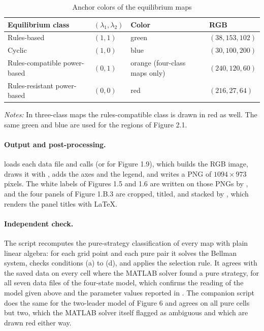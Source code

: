 \begin{table}[htbp]
\caption{Anchor colors of the equilibrium maps}
\label{tab:colors}
\centering
\small
\begin{tabular}{@{}llll@{}}
\toprule
Equilibrium class & $(\lambda_1, \lambda_2)$ & Color & RGB \\
\midrule
Rules-based & $(1, 1)$ & green & $(38, 153, 102)$ \\
Cyclic & $(1, 0)$ & blue & $(30, 100, 200)$ \\
Rules-compatible power-based & $(0, 1)$ & orange (four-class maps only) & $(240, 120, 60)$ \\
Rules-resistant power-based & $(0, 0)$ & red & $(216, 27, 64)$ \\
\bottomrule
\end{tabular}
\begin{minipage}{\linewidth}
\vspace{4pt}
\footnotesize
\textit{Notes:} In three-class maps the rules-compatible class is drawn in
red as well. The same green and blue are used for the regions of Figure 2.1.
\end{minipage}
\end{table}

\paragraph*{Output and post-processing.}
 loads each data file and calls 
(or  for Figure 1.9), which builds the RGB image,
draws it with , adds the axes and the legend, and writes a PNG
of $1094 \times 973$ pixels. The white labels of Figures 1.5 and 1.6 are
written on those PNGs by , and the four panels of
Figure 1.B.3 are cropped, titled, and stacked by ,
which renders the panel titles with \LaTeX.

\paragraph*{Independent check.}
The script  recomputes the
pure-strategy classification of every map with plain linear algebra: for
each grid point and each pure pair it solves the Bellman system, checks
conditions (a) to (d), and applies the selection rule. It agrees with the
saved data on every cell where the MATLAB solver found a pure strategy, for
all seven data files of the four-state model, which confirms the reading of
the model given above and the parameter values reported in
. The companion script
 does the same for the two-leader model
of Figure 6 and agrees on all pure cells but two, which the MATLAB
solver itself flagged as ambiguous and which are drawn red either way.
